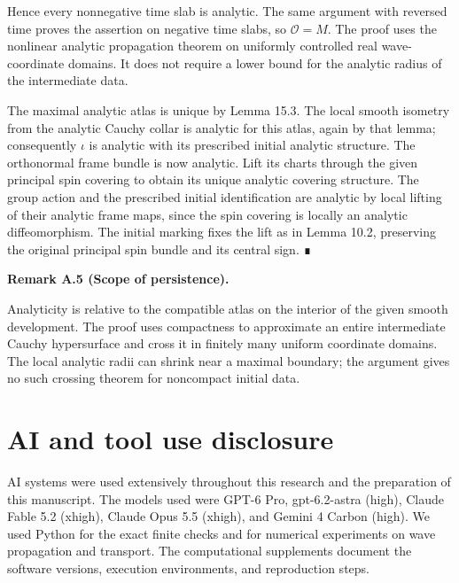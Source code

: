\documentclass[
  english,
  11pt,
  reqno]{amsart}
\makeatletter
\newcommand{\pandocstatementheading}[1]{%
  \par\if@nobreak\else
    \addpenalty{\@beginparpenalty}%
    \addvspace{.5\baselineskip plus .2\baselineskip minus .2\baselineskip}%
  \fi
  {\normalfont\bfseries #1\par}%
  \nobreak\@afterindenttrue\@afterheading
}
\makeatother
\begin{document}
Hence every nonnegative time slab is analytic. The same argument with
reversed time proves the assertion on negative time slabs, so
\(\mathcal O=M\). The proof uses the nonlinear analytic propagation
theorem on uniformly controlled real wave-coordinate domains. It does
not require a lower bound for the analytic radius of the intermediate
data.

The maximal analytic atlas is unique by Lemma 15.3. The local smooth
isometry from the analytic Cauchy collar is analytic for this atlas,
again by that lemma; consequently \(\iota\) is analytic with its
prescribed initial analytic structure. The orthonormal frame bundle is
now analytic. Lift its charts through the given principal spin covering
to obtain its unique analytic covering structure. The group action and
the prescribed initial identification are analytic by local lifting of
their analytic frame maps, since the spin covering is locally an
analytic diffeomorphism. The initial marking fixes the lift as in Lemma
10.2, preserving the original principal spin bundle and its central
sign. ∎

\pandocstatementheading{\protect{}\label{rem:compact-analytic-persistence-scope}Remark A.5 (Scope of persistence).}

Analyticity is relative to the compatible atlas on the interior of the
given smooth development. The proof uses compactness to approximate an
entire intermediate Cauchy hypersurface and cross it in finitely many
uniform coordinate domains. The local analytic radii can shrink near a
maximal boundary; the argument gives no such crossing theorem for
noncompact initial data.

\protect{}\label{sec:ai-and-tool-use-disclosure}

\section{AI and tool use disclosure}\label{ai-and-tool-use-disclosure}

AI systems were used extensively throughout this research and the
preparation of this manuscript. The models used were GPT-6 Pro,
gpt-6.2-astra (high), Claude Fable 5.2 (xhigh), Claude Opus 5.5 (xhigh),
and Gemini 4 Carbon (high). We used Python for the exact finite checks and for numerical experiments
on wave propagation and transport. The computational supplements
document the software versions, execution environments, and reproduction
steps.

\protect{}\label{sec:references}
\end{document}
